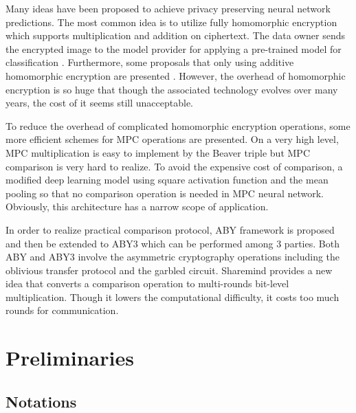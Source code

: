 \documentclass[letterpaper]{article} %
\begin{document}
    Many ideas have been proposed to achieve privacy preserving neural network predictions.
    The most common idea is to utilize fully homomorphic encryption which supports multiplication and addition on ciphertext.
    The data owner sends the encrypted image to the model provider for applying a pre-trained model for classification \cite{SEAL}.
    Furthermore, some proposals that only using additive homomorphic encryption are presented \cite{Homomorphic1} \cite{Homomorphic2}.
    However, the overhead of homomorphic encryption is so huge that though
    the associated technology evolves over many years\cite{ObliviousNeuralNetwork}, the cost of it seems still unacceptable.

    To reduce the overhead of complicated homomorphic encryption operations,
    some more efficient schemes for MPC operations are presented.
    On a very high level, MPC multiplication is easy to implement by the Beaver triple \cite{EfficientMultipartyProtocols}
    but MPC comparison is very hard to realize.
    To avoid the expensive cost of comparison,
    a modified deep learning model \cite{CryptoNets} using square activation function and the mean pooling so that
    no comparison operation is needed in MPC neural network.
    Obviously, this architecture has a narrow scope of application.

    In order to realize practical comparison protocol, ABY framework \cite{ABY} is proposed
    and then be extended to ABY3 \cite{ABY3} which can be performed among 3 parties.
    Both ABY and ABY3 involve the asymmetric cryptography operations
    including the oblivious transfer protocol and the garbled circuit.
    Sharemind provides a new idea that converts a comparison operation to
    multi-rounds bit-level multiplication.
    Though it lowers the computational difficulty, it costs too much rounds for
    communication.



\section{Preliminaries}
    \subsection{Notations}
\end{document}

